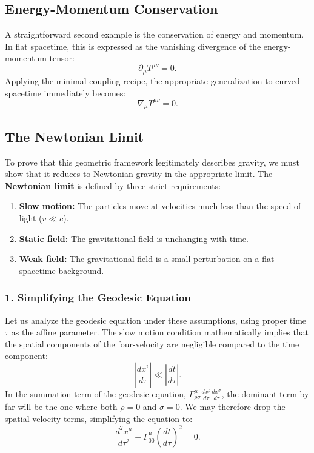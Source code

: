 \documentclass[11pt, a4paper]{report}
\begin{document}
\subsection*{Energy-Momentum Conservation}
A straightforward second example is the conservation of energy and momentum. In flat spacetime, this is expressed as the vanishing divergence of the energy-momentum tensor:
\begin{equation}
\partial_{\mu}T^{\mu\nu} = 0.
\end{equation}
Applying the minimal-coupling recipe, the appropriate generalization to curved spacetime immediately becomes:
\begin{equation}
\nabla_{\mu}T^{\mu\nu} = 0.
\end{equation}

\subsection*{The Newtonian Limit}
To prove that this geometric framework legitimately describes gravity, we must show that it reduces to Newtonian gravity in the appropriate limit. The \textbf{Newtonian limit} is defined by three strict requirements:
\begin{enumerate}
    \item \textbf{Slow motion:} The particles move at velocities much less than the speed of light ($v \ll c$).
    \item \textbf{Static field:} The gravitational field is unchanging with time.
    \item \textbf{Weak field:} The gravitational field is a small perturbation on a flat spacetime background.
\end{enumerate}

\subsubsection*{1. Simplifying the Geodesic Equation}
Let us analyze the geodesic equation under these assumptions, using proper time $\tau$ as the affine parameter. The slow motion condition mathematically implies that the spatial components of the four-velocity are negligible compared to the time component:
\begin{equation}
\left| \frac{dx^{i}}{d\tau} \right| \ll \left| \frac{dt}{d\tau} \right|.
\end{equation}
In the summation term of the geodesic equation, $\Gamma^{\mu}_{\rho\sigma} \frac{dx^{\rho}}{d\tau}\frac{dx^{\sigma}}{d\tau}$, the dominant term by far will be the one where both $\rho = 0$ and $\sigma = 0$. We may therefore drop the spatial velocity terms, simplifying the equation to:
\begin{equation}
\label{eq:geodesic_slow}
\frac{d^{2}x^{\mu}}{d\tau^{2}} + \Gamma^{\mu}_{00}\left(\frac{dt}{d\tau}\right)^{2} = 0.
\end{equation}
\end{document}
